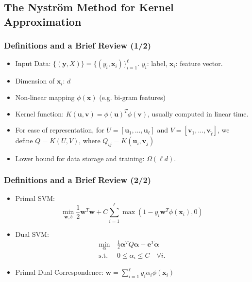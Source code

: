 \documentclass{beamer}
\def\bw{{\boldsymbol w}}
\def\bu{{\boldsymbol u}}
\def\balpha{{\boldsymbol \alpha}}
\def\be{{\boldsymbol e}}
\def\bx{{\boldsymbol x}}
\def\by{{\boldsymbol y}}
\def\bv{{\boldsymbol v}}
\begin{document}
\subsection{The Nystr\"om Method for Kernel Approximation}
\begin{frame}
  \frametitle{Definitions and a Brief Review (1/2)}
  \begin{itemize}
    \item Input Data: $\{(\by, X)\} = \{(y_i, \bx_i)\}_{i=1}^\ell$. $y_i$: label, $\bx_i$: feature vector.
    \item Dimension of $\bx_i$: $d$
    \item Non-linear mapping $\phi(\bx)$ (e.g. bi-gram features)
    \item Kernel function: $K(\bu, \bv) = \phi(\bu)^T \phi(\bv)$, usually computed in linear time.
    \item For ease of representation, for $U = [\bu_1, \dots, \bu_\ell]$ and $V = [\bv_1, \dots, \bv_{\tilde{\ell}}]$, we define $Q = K(U, V)$, where $Q_{ij} = K(\bu_i, \bv_j)$
    \pause
    \item Lower bound for data storage and training: $\Omega(\ell d)$.
  \end{itemize}
\end{frame}

\begin{frame}
  \frametitle{Definitions and a Brief Review (2/2)}
  \begin{itemize}
    \item Primal SVM:
    \begin{equation}
      \min_{\bw, b}
      \frac{1}{2} \bw^T\bw + C\sum_{i=1}^\ell \max(1-y_i\bw^T\phi(\bx_i), 0) \nonumber
    \end{equation} 
    \item Dual SVM: 
    \begin{align}
    \min_{\balpha} \  &  \frac{1}{2} \balpha^T Q  \balpha - \be^T \balpha \nonumber \\
    \mbox{s.t.} \  & 0 \le \alpha_i \le C \quad \forall i \mbox{.} \nonumber
    \end{align}
    \item Primal-Dual Correspondence: $\bw = \sum_{i=1}^\ell y_i \alpha_i \phi(\bx_i)$ 
  \end{itemize}
\end{frame}
\end{document}
